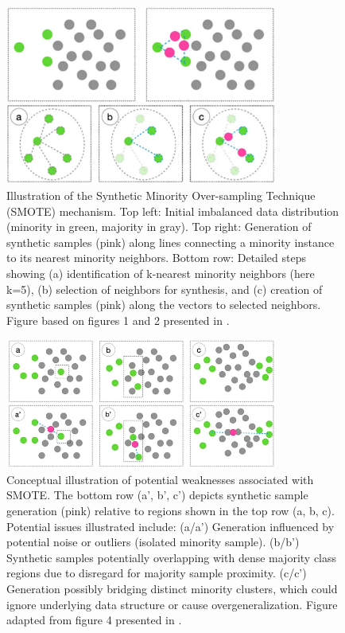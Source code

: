 \documentclass[12pt,a4paper]{report}
\begin{document}
\begin{figure}[htbp]
    \centering
    \includegraphics[width=0.8\textwidth]{images/SMOTE-explained.png}
    \caption[Illustration of the SMOTE mechanism]{Illustration of the Synthetic Minority Over-sampling Technique (SMOTE) mechanism. Top left: Initial imbalanced data distribution (minority in green, majority in gray). Top right: Generation of synthetic samples (pink) along lines connecting a minority instance to its nearest minority neighbors. Bottom row: Detailed steps showing (a) identification of k-nearest minority neighbors (here k=5), (b) selection of neighbors for synthesis, and (c) creation of synthetic samples (pink) along the vectors to selected neighbors. Figure based on figures 1 and 2 presented in \cite{Truong2022SMOTEVariants}.}
    \label{fig:SMOTE_explained} %
\end{figure}

\begin{figure}[htbp]
    \centering
    \includegraphics[width=0.8\textwidth]{images/SMOTE-weaknesses.png}
    \caption[Illustration of SMOTE weaknesses]{Conceptual illustration of potential weaknesses associated with SMOTE. The bottom row (a', b', c') depicts synthetic sample generation (pink) relative to regions shown in the top row (a, b, c). Potential issues illustrated include: (a/a') Generation influenced by potential noise or outliers (isolated minority sample). (b/b') Synthetic samples potentially overlapping with dense majority class regions due to disregard for majority sample proximity. (c/c') Generation possibly bridging distinct minority clusters, which could ignore underlying data structure or cause overgeneralization. Figure adapted from figure 4 presented in \cite{Truong2022SMOTEVariants}.}
    \label{fig:SMOTE_weaknesses} %
\end{figure}
\end{document}
